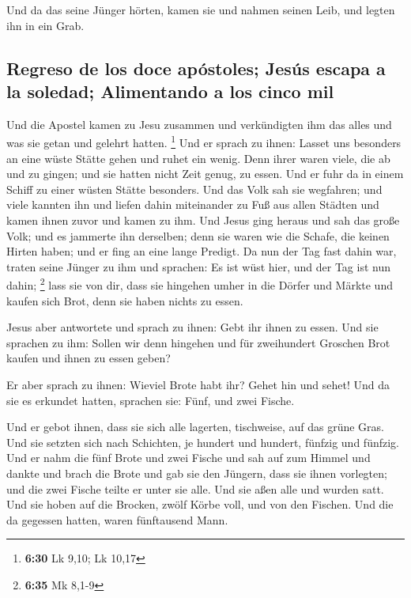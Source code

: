  Und da das seine Jünger hörten, kamen sie und nahmen
seinen Leib, und legten ihn in ein Grab.

\hypertarget{regreso-de-los-doce-apuxf3stoles-jesuxfas-escapa-a-la-soledad-alimentando-a-los-cinco-mil}{%
\subsection{Regreso de los doce apóstoles; Jesús escapa a la soledad;
Alimentando a los cinco
mil}\label{regreso-de-los-doce-apuxf3stoles-jesuxfas-escapa-a-la-soledad-alimentando-a-los-cinco-mil}}

 Und die Apostel kamen zu Jesu zusammen und verkündigten
ihm das alles und was sie getan und gelehrt hatten. \footnote{\textbf{6:30}
  Lk 9,10; Lk 10,17}  Und er sprach zu ihnen: Lasset uns
besonders an eine wüste Stätte gehen und ruhet ein wenig. Denn ihrer
waren viele, die ab und zu gingen; und sie hatten nicht Zeit genug, zu
essen.  Und er fuhr da in einem Schiff zu einer wüsten
Stätte besonders.  Und das Volk sah sie wegfahren; und
viele kannten ihn und liefen dahin miteinander zu Fuß aus allen Städten
und kamen ihnen zuvor und kamen zu ihm.  Und Jesus ging
heraus und sah das große Volk; und es jammerte ihn derselben; denn sie
waren wie die Schafe, die keinen Hirten haben; und er fing an eine lange
Predigt.  Da nun der Tag fast dahin war, traten seine
Jünger zu ihm und sprachen: Es ist wüst hier, und der Tag ist nun dahin;
\footnote{\textbf{6:35} Mk 8,1-9}  lass sie von dir, dass
sie hingehen umher in die Dörfer und Märkte und kaufen sich Brot, denn
sie haben nichts zu essen.

 Jesus aber antwortete und sprach zu ihnen: Gebt ihr
ihnen zu essen. Und sie sprachen zu ihm: Sollen wir denn hingehen und
für zweihundert Groschen Brot kaufen und ihnen zu essen geben?

 Er aber sprach zu ihnen: Wieviel Brote habt ihr? Gehet
hin und sehet! Und da sie es erkundet hatten, sprachen sie: Fünf, und
zwei Fische.

 Und er gebot ihnen, dass sie sich alle lagerten,
tischweise, auf das grüne Gras.  Und sie setzten sich
nach Schichten, je hundert und hundert, fünfzig und fünfzig.
 Und er nahm die fünf Brote und zwei Fische und sah auf
zum Himmel und dankte und brach die Brote und gab sie den Jüngern, dass
sie ihnen vorlegten; und die zwei Fische teilte er unter sie alle.
 Und sie aßen alle und wurden satt.  Und
sie hoben auf die Brocken, zwölf Körbe voll, und von den Fischen.
 Und die da gegessen hatten, waren fünftausend Mann.

